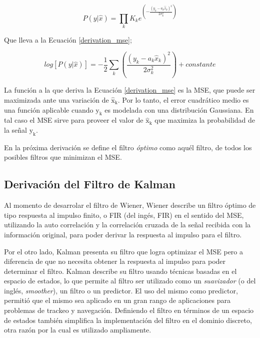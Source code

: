 \documentclass[10pt,a4paper]{article}
\begin{document}
\begin{equation}
    P(y|\hat{x}) = \prod_k K_ke^{\left(- \frac{(y_k - a_k\hat{x}_k)^2}{2\sigma^2_k}\right)} \label{max_likelihood}
\end{equation}

Que lleva a la Ecuaci\'on \ref{derivation_mse};

\begin{equation}
    log[P\left(y|\hat{x}\right)] = - \frac{1}{2}\sum_k \left(\frac{(y_k -
    a_k\hat{x}_k)^2}{2\sigma^2_k}\right) + constante \label{derivation_mse}
\end{equation}

La funci\'on a la que deriva la Ecuaci\'on \ref{derivation_mse} es la
\acrshort{MSE}, que puede ser maximizada ante una variaci\'on de
$\mathrm{\hat{x}_k}$. Por lo tanto, el error cuadr\'atico medio es una funci\'on
aplicable cuando $\mathrm{y_k}$ es modelada con una distribuci\'on Gaussiana.
En tal caso el \acrshort{MSE} sirve para proveer el valor de
$\mathrm{\hat{x}_k}$ que maximiza la probabilidad de la señal $\mathrm{y_k}$.

En la pr\'oxima derivaci\'on se define el filtro \emph{\'optimo} como aqu\'el
filtro, de todos los posibles filtros que minimizan el \acrshort{MSE}.

\subsection{Derivaci\'on del Filtro de Kalman}

\noindent Al momento de desarrolar el filtro de Wiener, Wiener describe un 
filtro \'optimo de tipo respuesta al impulso finito, o \acrshort{FIR} (del 
ing\'es, \acrlong{FIR}) en el sentido del \acrshort{MSE}, utilizando la auto
correlaci\'on y la correlaci\'on cruzada de la señal recibida con la
informaci\'on original, para poder derivar la respuesta al impulso para el
filtro. 

\noindent Por el otro lado, Kalman presenta su filtro que logra optimizar el
\acrshort{MSE} pero a diferencia de que no necesita obtener la respuesta al
impulso para poder determinar el filtro. Kalman describe su filtro usando
t\'ecnicas basadas en el espacio de estados, lo que permite al filtro ser
utilizado como un \emph{suavizador} (o del ingl\'es, \emph{smoother}), un filtro
o un predictor. El uso del mismo como predictor, permiti\'o que el mismo sea
aplicado en un gran rango de aplicaciones para problemas de trackeo y
navegaci\'on. Definiendo el filtro en t\'erminos de un espacio de estados
tambi\'en simplifica la implementaci\'on del filtro en el dominio discreto, otra
raz\'on por la cual es utilizado ampliamente.
\end{document}
